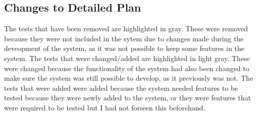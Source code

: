 \begin{landscape}
\subsection{Changes to Detailed Plan}

The tests that have been removed are highlighted in gray. These were removed because they were not included in the sytem due to changes made during the deveopment of the system, as it was not possible to keep some features in the system. The tests that were changed/added are highlighted in light gray. These were changed because the functionality of the system had also been changed to make sure the system was still possible to develop, as it previously was not. The tests that were added were added because the system needed features to be tested because they were newly added to the system, or they were features that were required to be tested but I had not forseen this beforehand.



\end{landscape}
